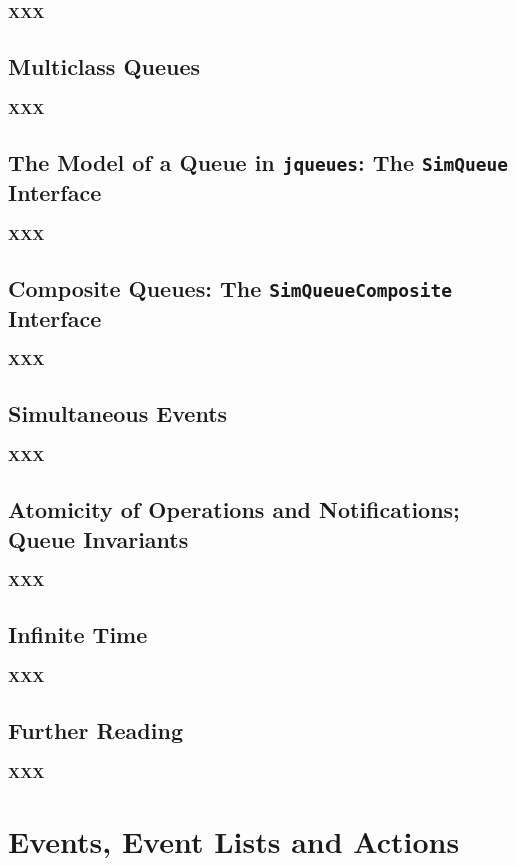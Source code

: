 \documentclass[12pt]{book}
\begin{document}
{\bf XXX}

\section{Multiclass Queues}
\label{sec:guided:qos}

{\bf XXX}

\section{The Model of a Queue in \lstinline|jqueues|: The \lstinline|SimQueue| Interface}
\label{sec:guided:simqueue-model}

{\bf XXX}

\section{Composite Queues: The \lstinline|SimQueueComposite| Interface}
\label{sec:guided:simqueue-composite}

{\bf XXX}

\section{Simultaneous Events}
\label{sec:guided:simultaneous-events}

{\bf XXX}

\section{Atomicity of Operations and Notifications; Queue Invariants}
\label{sec:guided:atomicity}

{\bf XXX}

\section{Infinite Time}
\label{sec:infinite-time}

{\bf XXX}

\section{Further Reading}
\label{sec:guided:further-reading}

{\bf XXX}

\chapter{Events, Event Lists and Actions}
\label{sec:events-eventlists-actions}
\end{document}
